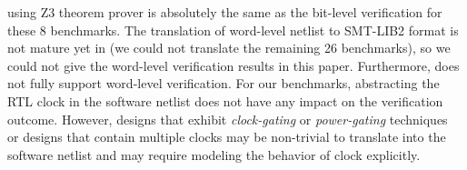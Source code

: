 using Z3 theorem prover is absolutely the same as the bit-level 
verification for these 8 benchmarks. The translation of word-level 
netlist to SMT-LIB2 format is not mature yet in \ebmc (we could not 
translate the remaining 26 benchmarks), so we could not give the 
word-level verification results in this paper. Furthermore, 
\ABC does not fully support word-level verification.  
%
For our benchmarks, abstracting the RTL clock in the software 
netlist does not have any impact on the verification outcome.   
However, designs that exhibit 
\emph{clock-gating} or \emph{power-gating} techniques~\cite{lowpower} 
or designs that contain multiple clocks may be non-trivial to translate 
into the software netlist and may require modeling the behavior of clock 
explicitly.  
%
